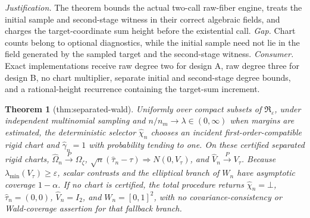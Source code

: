 \documentclass{article}
\newtheorem{theorem}{Theorem}
\begin{document}
\par\smallskip\noindent \textit{Justification.} The theorem bounds the actual two-call raw-fiber engine, treats the initial sample and second-stage witness in their correct algebraic fields, and charges the target-coordinate sum height before the existential call. \textit{Gap.} Chart counts belong to optional diagnostics, while the initial sample need not lie in the field generated by the sampled target and the second-stage witness. \textit{Consumer.} Exact implementations receive raw degree two for design A, raw degree three for design B, no chart multiplier, separate initial and second-stage degree bounds, and a rational-height recurrence containing the target-sum increment.

\begin{theorem}[thm:separated-wald]\label{thm:separated-wald}
Uniformly over compact subsets of \(\mathfrak R_{\varepsilon}\), under independent multinomial sampling and \(n/n_m\to\lambda\in(0,\infty)\) when margins are estimated, the deterministic selector \(\widehat\chi_n\) chooses an incident first-order-compatible rigid chart and \(\widehat\gamma_n=1\) with probability tending to one. On these certified separated rigid charts, \(\widehat\Omega_n\xrightarrow{P}\Omega_{\zeta}\), \(\sqrt n(\widehat\tau_n-\tau)\Rightarrow N(0,V_{\tau})\), and \(\widehat V_n\xrightarrow{P}V_{\tau}\). Because \(\lambda_{\min}(V_{\tau})\ge\varepsilon\), scalar contrasts and the elliptical branch of \(W_n\) have asymptotic coverage \(1-\alpha\). If no chart is certified, the total procedure returns \(\widehat\chi_n=\bot\), \(\widehat\tau_n=(0,0)\), \(\widehat V_n=I_2\), and \(W_n=[0,1]^2\), with no covariance-consistency or Wald-coverage assertion for that fallback branch.
\end{theorem}
\end{document}
